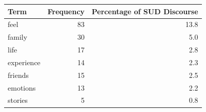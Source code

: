 \documentclass[
  man,
  longtable,
  nolmodern,
  notxfonts,
  notimes,
  colorlinks=true,linkcolor=blue,citecolor=blue,urlcolor=blue]{apa7}
\begin{document}
\begin{table}

{\caption{{Table 3. Personal-Emotional Framework: Top Co-occurring Terms
in SUD Discussions}{\label{tbl-study2-personal-theme}}}
\vspace{-20pt}}

\begin{longtable}[]{@{}lrr@{}}
\toprule\noalign{}
Term & Frequency & Percentage of SUD Discourse \\
\midrule\noalign{}
\endhead
\bottomrule\noalign{}
\endlastfoot
feel & 83 & 13.8 \\
family & 30 & 5.0 \\
life & 17 & 2.8 \\
experience & 14 & 2.3 \\
friends & 15 & 2.5 \\
emotions & 13 & 2.2 \\
stories & 5 & 0.8 \\
\end{longtable}

\end{table}
\end{document}
